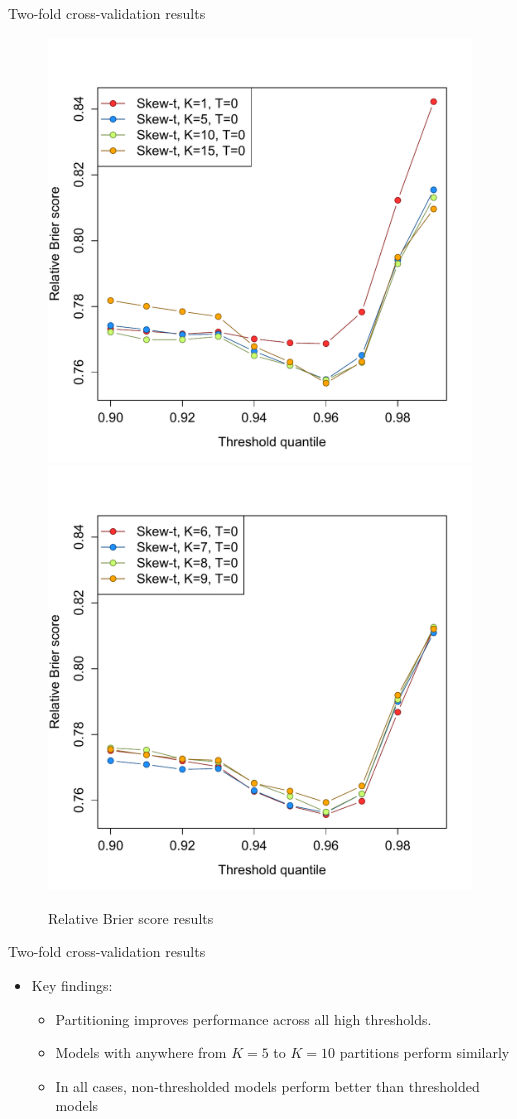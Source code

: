\documentclass{beamer}
\begin{document}
\begin{frame}{Two-fold cross-validation results}
  \centering
  \begin{figure}
    \includegraphics[width=0.45\linewidth]{./plots/pot/bs-ozone-1.pdf}
    \includegraphics[width=0.45\linewidth]{./plots/pot/bs-ozone-2.pdf} \\
    \caption{Relative Brier score results}
  \end{figure}
\end{frame}

\begin{frame}{Two-fold cross-validation results}
  \begin{itemize} \setlength{\itemsep}{0.5em}
    \item Key findings:
    \begin{itemize}
      \item Partitioning improves performance across all high thresholds.
      \item Models with anywhere from $K = 5$ to $K = 10$ partitions perform similarly
      \item In all cases, non-thresholded models perform better than thresholded models
    \end{itemize}
  \end{itemize}
\end{frame}

\end{document}

